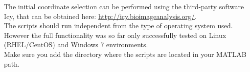 \documentclass[10pt,a4paper,onepage,DIV12]{scrartcl}
\begin{document}
The initial coordinate selection can be performed using the third-party software Icy, that can be obtained here: \url{http://icy.bioimageanalysis.org/}.
\\
The scripts should run independent from the type of operating system used. However the full functionality was so far only successfully tested on Linux (RHEL/CentOS) and Windows 7 environments.
\\

Make sure you add the directory where the scripts are located in your MATLAB path.
% 
% 
% 
% 
\end{document}
